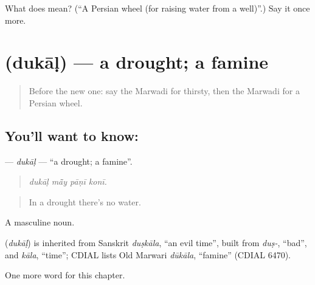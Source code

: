 \begin{tcolorbox}[breakable,colback=teal!4,colframe=teal!35!black,title={Before you move on}]
What does  mean? (\textquotedblleft{}A Persian wheel (for raising water from a well)\textquotedblright{}.) Say it once more.
\end{tcolorbox}
\section[\texorpdfstring{\mw{दुकाळ} (dukāḷ)}{दुकाळ (dukāḷ)}]{ (dukāḷ) — a drought; a famine}

\label{lesson:MW-C227-dukal}



\begin{quote}
Before the new one: say the Marwadi for thirsty, then the Marwadi for a Persian wheel.
\end{quote}

\subsection*{You'll want to know: }
\textbf{} — \emph{dukāḷ} — \textquotedblleft{}a drought; a famine\textquotedblright{}.

\begin{quote}
   
\end{quote}

\begin{quote}
\emph{dukāḷ mā̃y pāṇī konī.}
\end{quote}

\begin{quote}
In a drought there's no water.
\end{quote}

A masculine noun.

\begin{cousinweb}
\textbf{} (\emph{dukāḷ}) is inherited from Sanskrit \emph{duṣkāla}, \textquotedblleft{}an evil time\textquotedblright{}, built from \emph{duṣ-}, \textquotedblleft{}bad\textquotedblright{}, and \emph{kāla}, \textquotedblleft{}time\textquotedblright{}; CDIAL lists Old Marwari \emph{dūkāla}, \textquotedblleft{}famine\textquotedblright{} (CDIAL 6470).
\end{cousinweb}

\begin{grammarlens}[title={What you've built}]
One more word for this chapter.
\end{grammarlens}

